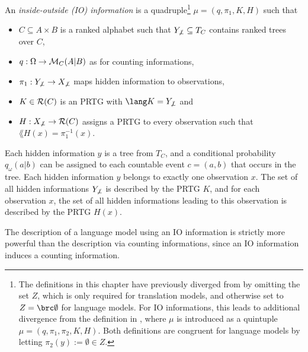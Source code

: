 \begin{definition}
 An \emph{inside-outside (IO) information} is a quadruple\footnote{The definitions
 in this chapter have previously diverged from \cite{bucstuvog15} by omitting
 the set $Z$, which is only required for translation models, and otherwise set
 to $Z=\brc\emptyset$ for language models. For IO informations, this leads to
 additional divergence from the definition in \cite{bucstuvog15}, where $\mu$
 is introduced as a quintuple $\mu=(q,\pi_1,\pi_2,K,H)$. Both definitions are
 congruent for language models by letting $\pi_2(y) :=
 \emptyset\in Z$.} $\mu = (q,\pi_1,K,H)$ such that
 \begin{itemize}\setlength\itemsep{-0.3em}
  \item $C\subseteq A\times B$ is a ranked alphabet such that $Y_{\not\bot}\subseteq T_C$ contains ranked trees over $C$,
  \item $q:\Omega\to\mathcal M_C(A|B)$ as for counting informations,
  \item $\pi_1:Y_{\not\bot}\to X_{\not\bot}$ maps hidden information to observations,
  \item $K\in\mathcal R(C)$ is an PRTG with $\lang K = Y_{\not\bot}$ and
  \item $H:X_{\not\bot}\to\mathcal R(C)$ assigns a PRTG to every observation such that $\lang{H(x)} = \pi_1^{-1}(x)$.
 \end{itemize}
\end{definition}

Each hidden information $y$ is a tree from $T_C$, and a conditional probability
$q_\omega(a|b)$ can be assigned to each countable event $c = (a,b)$ that occurs
in the tree. Each hidden information $y$ belongs to exactly one observation
$x$. The set of all hidden informations $Y_{\not\bot}$ is described by the PRTG
$K$, and for each observation $x$, the set of all hidden informations leading
to this observation is described by the PRTG $H(x)$.

The description of a language model using an IO information is strictly more
powerful than the description via counting informations, since an IO
information induces a counting information.

